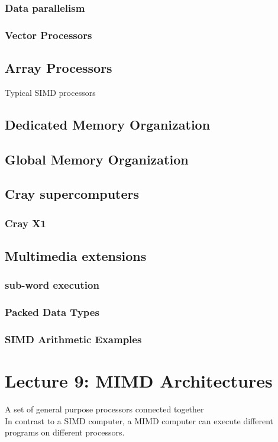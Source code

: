 \documentclass[titlepage, a4paper]{article}
\begin{document}
\subsubsection{Data parallelism}
\subsubsection{Vector Processors}
\subsection{Array Processors}
Typical SIMD processors

\subsection{Dedicated Memory Organization}
\subsection{Global Memory Organization}
\subsection{Cray supercomputers}
\subsubsection{Cray X1}
\subsection{Multimedia extensions}
\subsubsection{sub-word execution}
\subsubsection{Packed Data Types}
\subsubsection{SIMD Arithmetic Examples}

\section{Lecture 9: MIMD Architectures}
A set of general purpose processors connected together \\
In contrast to a SIMD computer, a MIMD computer can execute different programs on different processors. \\
\end{document}
